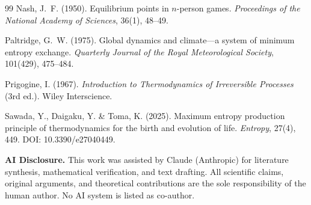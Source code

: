 \documentclass[12pt,a4paper]{article}
\theoremstyle{remark}
\begin{document}
{\begin{thebibliography}{99}
Nash, J.~F. (1950).
\newblock Equilibrium points in $n$-person games.
\newblock \textit{Proceedings of the National Academy of Sciences}, 36(1), 48--49.

Paltridge, G.~W. (1975).
\newblock Global dynamics and climate---a system of minimum entropy exchange.
\newblock \textit{Quarterly Journal of the Royal Meteorological Society}, 101(429), 475--484.

Prigogine, I. (1967).
\newblock \textit{Introduction to Thermodynamics of Irreversible Processes} (3rd ed.).
\newblock Wiley Interscience.

Sawada, Y., Daigaku, Y. \& Toma, K. (2025).
\newblock Maximum entropy production principle of thermodynamics for the birth and evolution of life.
\newblock \textit{Entropy}, 27(4), 449.
\newblock DOI: 10.3390/e27040449.

\end{thebibliography}

\medskip
\noindent\textbf{AI Disclosure.} This work was assisted by Claude (Anthropic) for literature synthesis, mathematical verification, and text drafting. All scientific claims, original arguments, and theoretical contributions are the sole responsibility of the human author. No AI system is listed as co-author.
}
\end{document}
